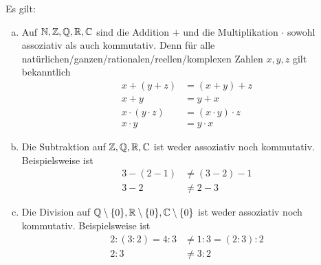 \begin{bsp}[Grundrechenarten]
 Es gilt:
 \begin{enumerate}[a)]
  \item Auf ${\mathbb N},{\mathbb Z},{\mathbb Q},{\mathbb R},{\mathbb C}$ sind die Addition $+$ und die Multiplikation $\cdot$ sowohl assoziativ als auch kommutativ. Denn für alle natürlichen/ganzen/rationalen/reellen/komplexen Zahlen $x,y,z$ gilt bekanntlich
  \begin{align*}
   x+(y+z)& = (x+y)+z  \\
   x+y & = y+x \\
  x\cdot (y\cdot z) & = (x\cdot y)\cdot z  \\
   x\cdot y & = y\cdot x
  \end{align*}
  \item Die Subtraktion auf ${\mathbb Z},{\mathbb Q},{\mathbb R},{\mathbb C}$ ist weder assoziativ noch kommutativ. Beispielsweise ist
  \begin{align*}
   3-(2-1) &\neq  (3-2)-1  \\
  3-2 &\neq 2-3
  \end{align*}
\item Die Division auf ${\mathbb Q}\setminus \{0\},{\mathbb R}\setminus \{0\},{\mathbb C}\setminus \{0\}$ ist weder assoziativ noch kommutativ. Beispielsweise ist
\begin{align*}
 2:(3:2) = 4:3 &\neq 1:3 = (2:3):2 \\
2 : 3 & \neq 3:2
\end{align*}
 \end{enumerate}
\end{bsp}


\begin{comment}
\begin{bsp}
 Die Grundrechenarten sind vergleichbar simple Verknüpfungen. Allgemeine Verknüpfungen dürfen aber beliebig kompliziert sein:
 \begin{itemize}
  \item Die Abbildung
  \[ \Rz_{>0}\times \Rz_{>0} \to \Rz_{>0} \ ,\ (x,y)\mapsto \frac{2xy}{x+y} \]
  ist eine zweistellige Verknüpfung auf $\Rz_{>0}$.
  \item Das \textbf{arithmetische Mittel} (umgangssprachlich „Durchschnitt“)
    \[ \Rz \times \Rz \to \Rz \ ,\ (x,y)\mapsto \frac{x+y}{2} \]
  ist eine zweistellige Verknüpfung auf $\Rz$.
 \end{itemize}
\end{bsp}
\end{comment}


